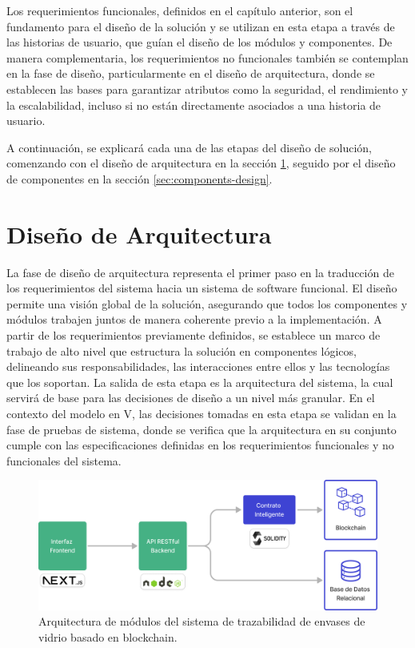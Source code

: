 Los requerimientos funcionales, definidos en el capítulo anterior, son el fundamento para el diseño de la solución y se utilizan en esta etapa a través de las historias de usuario, que guían el diseño de los módulos y componentes. De manera complementaria, los requerimientos no funcionales también se contemplan en la fase de diseño, particularmente en el diseño de arquitectura, donde se establecen las bases para garantizar atributos como la seguridad, el rendimiento y la escalabilidad, incluso si no están directamente asociados a una historia de usuario.

A continuación, se explicará cada una de las etapas del diseño de solución, comenzando con el diseño de arquitectura en la sección \ref{sec:module-design}, seguido por el diseño de componentes en la sección \ref{sec:components-design}.

\section{Diseño de Arquitectura}
\label{sec:module-design}

La fase de diseño de arquitectura representa el primer paso en la traducción de los requerimientos del sistema hacia un sistema de software funcional. El diseño permite una visión global de la solución, asegurando que todos los componentes y módulos trabajen juntos de manera coherente previo a la implementación. A partir de los requerimientos previamente definidos, se establece un marco de trabajo de alto nivel que estructura la solución en componentes lógicos, delineando sus responsabilidades, las interacciones entre ellos y las tecnologías que los soportan. La salida de esta etapa es la arquitectura del sistema, la cual servirá de base para las decisiones de diseño a un nivel más granular. En el contexto del modelo en V, las decisiones tomadas en esta etapa se validan en la fase de pruebas de sistema, donde se verifica que la arquitectura en su conjunto cumple con las especificaciones definidas en los requerimientos funcionales y no funcionales del sistema.
\begin{figure}[!htb]
    \centering
    \includegraphics[width=0.8\linewidth]{Figures/software-architecture.png}
    \caption{Arquitectura de módulos del sistema de trazabilidad de envases de vidrio basado en blockchain.}
    \label{fig:software-architecture}
\end{figure}

